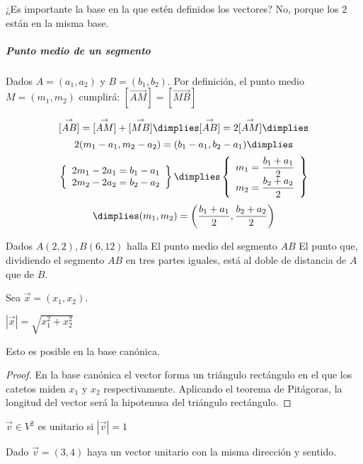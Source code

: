 \obs ¿Es importante la base en la que estén definidos los vectores? No, porque los 2 están en la misma base.

\subparagraph{Punto medio de un segmento} Dados $A=(a_1,a_2)$ y $B=(b_1,b_2)$. Por definición, el punto medio $M=(m_1,m_2)$ cumplirá: $[\vec{AM}] = [\vec{MB}]$

\[
[\vec{AB}] = [\vec{AM}] + [\vec{MB}]\dimplies
[\vec{AB}] = 2[\vec{AM}] \dimplies \]\[
2(m_1-a_1,m_2-a_2) = (b_1-a_1,b_2-a_1) \dimplies
\]
\[
\left\{
	\begin{array}{c}
	2m_1-2a_1 = b_1-a_1\\
	2m_2-2a_2 = b_2-a_2
	\end{array}
\right\}\dimplies
\left\{
	\begin{array}{c}
	m_1 = \displaystyle\frac{b_1+a_1}{2}\\
	m_2 = \displaystyle\frac{b_2+a_2}{2}
	\end{array}
\right\}\]\[
\dimplies (m_1,m_2) = \left(\frac{b_1+a_1}{2},\frac{b_2+a_2}{2}\right)
\]

\begin{problem}
Dados $A(2,2), B(6,12)$ halla
\ppart El punto medio del segmento $AB$
\ppart El punto que, dividiendo el segmento $AB$ en tres partes iguales, está al doble de distancia de $A$  que de $B$.
\solution
\newpage
\end{problem}

\begin{prop} 
Sea $\vec{x} = (x_1,x_2)$.

$|\vec{x}| = \sqrt{x_1^2+x_2^2}$

\obs Esto es posible en la base canónica.
\end{prop}
\begin{proof}
En la base canónica el vector forma un triángulo rectángulo en el que los catetos miden $x_1$ y $x_2$ respectivamente. Aplicando el teorema de Pitágoras, la longitud del vector será la hipotenusa del triángulo rectángulo.
\end{proof}


\begin{defn} $\vec{v}\in V^2$ es unitario si $|\vec{v}|=1$
\end{defn}

\begin{problem}
Dado $\vec{v}=(3,4)$ haya un vector unitario con la misma dirección y sentido.
\solution

\end{problem}

